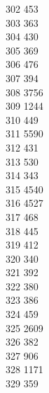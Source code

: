 { 302	453 \\
 303	363 \\
 304	430 \\
 305	369 \\
 306	476 \\
 307	394 \\
 308	3756 \\
 309	1244 \\
 310	449 \\
 311	5590 \\
 312	431 \\
 313	530 \\
 314	343 \\
 315	4540 \\
 316	4527 \\
 317	468 \\
 318	445 \\
 319	412 \\
 320	340 \\
 321	392 \\
 322	380 \\
 323	386 \\
 324	459 \\
 325	2609 \\
 326	382 \\
 327	906 \\
 328	1171 \\
 329	359 \\
}
